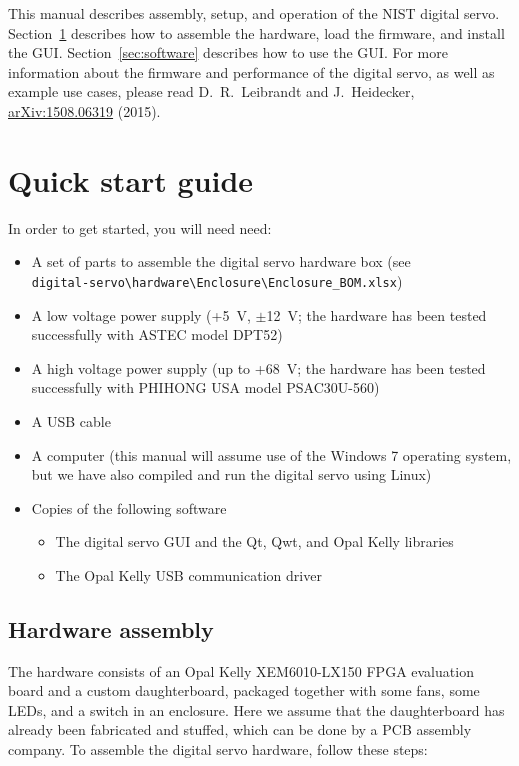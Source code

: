 \documentclass[aip,rsi,preprint,graphicx]{revtex4-1}
\begin{document}
This manual describes assembly, setup, and operation of the NIST digital servo.  Section~\ref{sec:quickStart} describes how to assemble the hardware, load the firmware, and install the GUI.  Section~\ref{sec:software} describes how to use the GUI.  For more information about the firmware and performance of the digital servo, as well as example use cases, please read D.~R.~Leibrandt and J.~Heidecker, \href{http://arxiv.org/abs/1508.06319}{arXiv:1508.06319} (2015).

\section{Quick start guide}\label{sec:quickStart}

In order to get started, you will need need:
\begin{itemize}
\item A set of parts to assemble the digital servo hardware box (see \\{\tt digital-servo\textbackslash hardware\textbackslash Enclosure\textbackslash Enclosure\_BOM.xlsx})
\item A low voltage power supply (+5~V, $\pm$12~V; the hardware has been tested successfully with ASTEC model DPT52)
\item A high voltage power supply (up to +68~V; the hardware has been tested successfully with PHIHONG USA model PSAC30U-560)
\item A USB cable
\item A computer (this manual will assume use of the Windows 7 operating system, but we have also compiled and run the digital servo using Linux)
\item Copies of the following software
\begin{itemize}
\item The digital servo GUI and the Qt, Qwt, and Opal Kelly libraries
\item The Opal Kelly USB communication driver
\end{itemize}
\end{itemize}

\subsection{Hardware assembly}

The hardware consists of an Opal Kelly XEM6010-LX150 FPGA evaluation board and a custom daughterboard, packaged together with some fans, some LEDs, and a switch in an enclosure.  Here we assume that the daughterboard has already been fabricated and stuffed, which can be done by a PCB assembly company.  To assemble the digital servo hardware, follow these steps:
\end{document}
